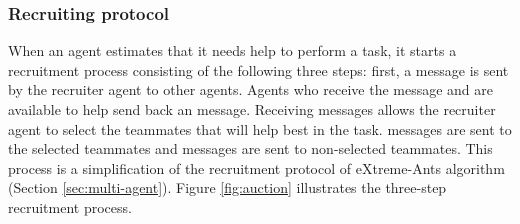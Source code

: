 \subsubsection{Recruiting protocol}
\label{sec:recruiting}
When an agent estimates that it needs help to perform a task, it starts a recruitment process consisting of the following three steps: first, a  message is sent by the recruiter agent to other agents. Agents who receive the  message and are available to help  send back an  message. Receiving  messages allows the recruiter agent to select the teammates that will help best in the task.  messages are sent to the selected teammates and  messages are sent to non-selected teammates. This process is a simplification of the recruitment protocol of eXtreme-Ants algorithm (Section \ref{sec:multi-agent}). Figure \ref{fig:auction} illustrates the three-step recruitment process.


